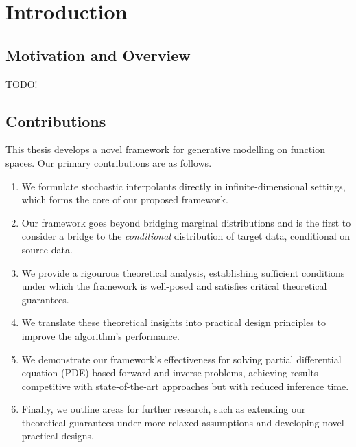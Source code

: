 
\chapter{Introduction} \label{cha:1}  %

\ifpdf
\graphicspath{{Chapter1/Figs/Raster/}{Chapter1/Figs/PDF/}{Chapter1/Figs/}}
\else
\graphicspath{{Chapter1/Figs/Vector/}{Chapter1/Figs/}}
\fi

\section{Motivation and Overview}
TODO!

\section{Contributions}
This thesis develops a novel framework for generative modelling on function spaces. Our primary contributions are as follows.
\begin{enumerate}
  \item We formulate stochastic interpolants directly in infinite-dimensional settings, which forms the core of our proposed framework.
  \item Our framework goes beyond bridging marginal distributions and is the first to consider a bridge to the \textit{conditional} distribution of target data, conditional on source data.
  \item We provide a rigourous theoretical analysis, establishing sufficient conditions under which the framework is well-posed and satisfies critical theoretical guarantees.
  \item We translate these theoretical insights into practical design principles to improve the algorithm's performance.
  \item We demonstrate our framework's effectiveness for solving partial differential equation (PDE)-based forward and inverse problems, achieving results competitive with state-of-the-art approaches but with reduced inference time.
  \item Finally, we outline areas for further research, such as extending our theoretical guarantees under more relaxed assumptions  and developing novel practical designs.
\end{enumerate}

